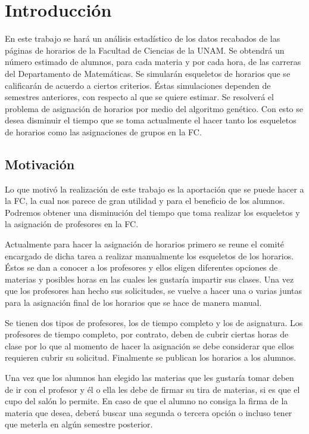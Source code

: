 \chapter{Introducción}

En este trabajo se hará un análisis estadístico de los datos recabados de las páginas de horarios de la Facultad de Ciencias de la UNAM. Se obtendrá un número estimado de alumnos, para cada materia y por cada hora, de las carreras del Departamento de Matemáticas. Se simularán esqueletos de horarios que se calificarán de acuerdo a ciertos criterios. Éstas simulaciones dependen de semestres anteriores, con respecto al que se quiere estimar. Se resolverá el problema de asignación de horarios por medio del algoritmo genético. Con esto se desea disminuir el tiempo que se toma actualmente el hacer tanto los esqueletos de horarios como las asignaciones de grupos en la FC.

\section{Motivación}

Lo que motivó la realización de este trabajo es la aportación que se puede hacer a la FC, la cual nos parece de gran utilidad y para el beneficio de los alumnos. Podremos obtener una disminución del tiempo que toma realizar los esqueletos y la asignación de profesores en la FC.

Actualmente para hacer la asignación de horarios primero se reune el comité encargado de dicha tarea a realizar manualmente los esqueletos de los horarios. Éstos se dan a conocer a los profesores y ellos eligen diferentes opciones de materias y posibles horas en las cuales les gustaría impartir sus clases. Una vez que los profesores han hecho sus solicitudes, se vuelve a hacer una o varias juntas para la asignación final de los horarios que se hace de manera manual.

Se tienen dos tipos de profesores, los de tiempo completo y los de asignatura. Los profesores de tiempo completo, por contrato, deben de cubrir ciertas horas de clase por lo que al momento de hacer la asignación se debe considerar que ellos requieren cubrir su solicitud. Finalmente se publican los horarios a los alumnos.

Una vez que los alumnos han elegido las materias que les gustaría tomar deben de ir con el profesor y él o ella les debe de firmar su tira de materias, si es que el cupo del salón lo permite. En caso de que el alumno no consiga la firma de la materia que desea, deberá buscar una segunda o tercera opción o incluso tener que meterla en algún semestre posterior.

